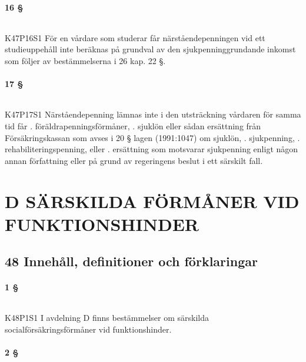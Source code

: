 \documentclass[a4paper,notitlepage,openany,10pt]{book}
\begin{document}
\subsection*{16 §}
\paragraph*{}
{\tiny K47P16S1}
För en vårdare som studerar får närståendepenningen vid ett studieuppehåll inte beräknas på grundval av den sjukpenninggrundande inkomst som följer av bestämmelserna i 26 kap. 22 §.
\subsection*{17 §}
\paragraph*{}
{\tiny K47P17S1}
Närståendepenning lämnas inte i den utsträckning vårdaren för samma tid får
. föräldrapenningsförmåner,
. sjuklön eller sådan ersättning från Försäkringskassan som avses i 20 § lagen (1991:1047) om sjuklön,
. sjukpenning,
. rehabiliteringspenning, eller
. ersättning som motsvarar sjukpenning enligt någon annan författning eller på grund av regeringens beslut i ett särskilt fall.
\part*{D SÄRSKILDA FÖRMÅNER VID FUNKTIONSHINDER}
\chapter*{48 Innehåll, definitioner och förklaringar}
\subsection*{1 §}
\paragraph*{}
{\tiny K48P1S1}
I avdelning D finns bestämmelser om särskilda socialförsäkringsförmåner vid funktionshinder.
\subsection*{2 §}
\end{document}

